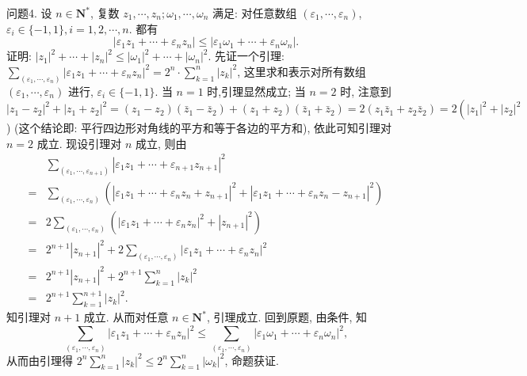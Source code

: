问题4. 设 $n \in \mathbf{N}^*$, 复数 $z_1, \cdots, z_n ; \omega_1, \cdots, \omega_n$ 满足: 对任意数组 $\left(\varepsilon_1, \cdots, \varepsilon_n\right)$, $\varepsilon_i \in\{-1,1\}, i=1,2, \cdots, n$. 都有
$$
\left|\varepsilon_1 z_1+\cdots+\varepsilon_n z_n\right| \leqslant\left|\varepsilon_1 \omega_1+\cdots+\varepsilon_n \omega_n\right| .
$$
证明: $\left|z_1\right|^2+\cdots+\left|z_n\right|^2 \leqslant\left|\omega_1\right|^2+\cdots+\left|\omega_n\right|^2$.
先证一个引理: $\sum_{\left(\varepsilon_1, \cdots, \varepsilon_n\right)}\left|\varepsilon_1 z_1+\cdots+\varepsilon_n z_n\right|^2=2^n \cdot \sum_{k=1}^n\left|z_k\right|^2$, 这里求和表示对所有数组 $\left(\varepsilon_1, \cdots, \varepsilon_n\right)$ 进行, $\varepsilon_i \in\{-1,1\}$.
当 $n=1$ 时,引理显然成立; 当 $n=2$ 时, 注意到 $\left|z_1-z_2\right|^2+\mid z_1+ \left.z_2\right|^2=\left(z_1-z_2\right)\left(\bar{z}_1-\bar{z}_2\right)+\left(z_1+z_2\right)\left(\bar{z}_1+\bar{z}_2\right)=2\left(z_1 \bar{z}_1+z_2 \bar{z}_2\right)= 2\left(\left|z_1\right|^2+\left|z_2\right|^2\right.$ ) (这个结论即: 平行四边形对角线的平方和等于各边的平方和), 依此可知引理对 $n=2$ 成立.
现设引理对 $n$ 成立, 则由
$$
\begin{aligned}
& \sum_{\left(\varepsilon_1, \cdots, \varepsilon_{n+1}\right)}\left|\varepsilon_1 z_1+\cdots+\varepsilon_{n+1} z_{n+1}\right|^2 \\
= & \sum_{\left(\varepsilon_1, \cdots, \varepsilon_n\right)}\left(\left|\varepsilon_1 z_1+\cdots+\varepsilon_n z_n+z_{n+1}\right|^2+\left|\varepsilon_1 z_1+\cdots+\varepsilon_n z_n-z_{n+1}\right|^2\right) \\
= & 2 \sum_{\left(\varepsilon_1, \cdots, \varepsilon_n\right)}\left(\left|\varepsilon_1 z_1+\cdots+\varepsilon_n z_n\right|^2+\left|z_{n+1}\right|^2\right) \\
= & 2^{n+1}\left|z_{n+1}\right|^2+2 \sum_{\left(\varepsilon_1, \cdots, \varepsilon_n\right)}\left|\varepsilon_1 z_1+\cdots+\varepsilon_n z_n\right|^2 \\
= & 2^{n+1}\left|z_{n+1}\right|^2+2^{n+1} \sum_{k=1}^n\left|z_k\right|^2 \\
= & 2^{n+1} \sum_{k=1}^{n+1}\left|z_k\right|^2 .
\end{aligned}
$$
知引理对 $n+1$ 成立.
从而对任意 $n \in \mathbf{N}^*$, 引理成立.
回到原题, 由条件, 知
$$
\sum_{\left(\varepsilon_1, \cdots, \varepsilon_n\right)}\left|\varepsilon_1 z_1+\cdots+\varepsilon_n z_n\right|^2 \leqslant \sum_{\left(\varepsilon_1, \cdots, \varepsilon_n\right)}\left|\varepsilon_1 \omega_1+\cdots+\varepsilon_n \omega_n\right|^2,
$$
从而由引理得 $2^n \sum_{k=1}^n\left|z_k\right|^2 \leqslant 2^n \sum_{k=1}^n\left|\omega_k\right|^2$, 命题获证.



